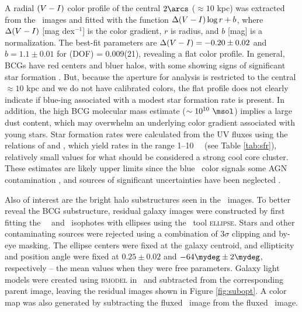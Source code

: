 \documentclass[11pt, preprint]{aastex}
\begin{document}
A radial $(V-I)$ color profile of the central $2\arcs$ ($\approx
10$ kpc) was extracted from the \hst\ images and fitted with the
function $\Delta(V-I) \log r + b$, where $\Delta(V-I)$
[mag dex$^{-1}$] is the color gradient, $r$ is radius, and $b$ [mag]
is a normalization. The best-fit parameters are $\Delta(V-I) =
-0.20 \pm 0.02$ and $b = 1.1 \pm 0.01$ for \chisq(DOF) = 0.009(21),
revealing a flat color profile. In general, BCGs have red centers and
bluer halos, with some showing signs of significant star formation
\citep[\eg][]{rafferty06}. But, because the aperture for analysis is
restricted to the central $\approx 10$ kpc and we do not have
calibrated colors, the flat profile does not clearly indicate if
blue-ing associated with a modest star formation rate is present. In
addition, the high BCG molecular mass estimate ($\sim 10^{10} ~\msol$)
implies a large dust content, which may overwhelm an underlying color
gradient associated with young stars. Star formation rates were
calculated from the UV fluxes using the relations of
\citet{kennicutt2} and \citet{salim2007}, which yield rates in the
range 1--10 ~\msolpy\ (see Table \ref{tab:sfr}), relatively small
values for what should be considered a strong cool core cluster. These
estimates are likely upper limits since the blue \galex\ color signals
some AGN contamination \citep{2005AJ....130.1022A}, and sources of
significant uncertainties have been neglected
\citep[\eg][]{1992ApJ...388..310K, 2004AJ....127.2002K, hicksuv,
  2010MNRAS.tmp..626G}.

Also of interest are the bright halo substructures seen in the
\hst\ images. To better reveal the BCG substructure, residual galaxy
images were constructed by first fitting the \hst\ \myv\ and
\myi\ isophotes with ellipses using the \iraf\ tool
                {\textsc{ellipse}}. Stars and other contaminating
                sources were rejected using a combination of $3\sigma$
                clipping and by-eye masking. The ellipse centers were
                fixed at the galaxy centroid, and ellipticity and
                position angle were fixed at $0.25 \pm 0.02$ and
                $-64\mydeg \pm 2\mydeg$, respectively -- the mean
                values when they were free parameters. Galaxy light
                models were created using {\textsc{bmodel}} in
                \iraf\ and subtracted from the corresponding parent
                image, leaving the residual images shown in Figure
                \ref{fig:subopt}. A color map was also generated by
                subtracting the fluxed \myi\ image from the fluxed
                \myv\ image.
\end{document}
